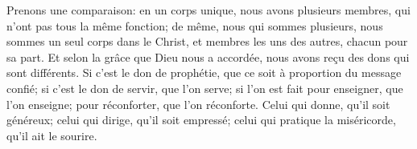 Prenons une comparaison:
	en un corps unique, nous avons plusieurs membres,
	qui n’ont pas tous la même fonction;
	de même, nous qui sommes plusieurs,
		nous sommes un seul corps dans le Christ,
	et membres les uns des autres, chacun pour sa part.
Et selon la grâce que Dieu nous a accordée,
	nous avons reçu des dons qui sont différents.
Si c’est le don de prophétie, que ce soit à proportion du message confié;
	si c’est le don de servir, que l’on serve;
	si l’on est fait pour enseigner, que l’on enseigne;
	pour réconforter, que l’on réconforte.
Celui qui donne, qu’il soit généreux;
	celui qui dirige, qu’il soit empressé;
	celui qui pratique la miséricorde, qu’il ait le sourire.
